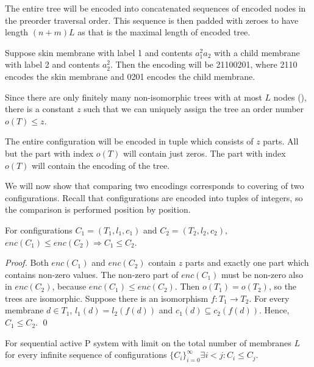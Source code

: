 \documentclass[llncs,submission,copyright,creativecommons]{../lib/lncs/llncs}
\begin{document}
The entire tree will be encoded into concatenated sequences of encoded nodes in the preorder traversal order. This sequence is then padded with zeroes to have length $(n+m)L$ as that is the maximal length of encoded tree.

\begin{example}
  Suppose skin membrane with label 1 and contents $a_1^2a_2$ with a child membrane with label 2 and contents $a_2^2$. Then the encoding will be 21100201, where 2110 encodes the skin membrane and 0201 encodes the child membrane.
\end{example} 

Since there are only finitely many non-isomorphic trees with at most $L$ nodes (\cite{Cayley1881RootedTrees}), there is a constant $z$ such that we can uniquely assign the tree an order number $o(T) \leq z$.

The entire configuration will be encoded in tuple which consists of $z$ parts. All but the part with index $o(T)$ will contain just zeros. The part with index $o(T)$ will contain the encoding of the tree.

We will now show that comparing two encodings corresponds to covering of two configurations. Recall that configurations are encoded into tuples of integers, so the comparison is performed position by position.

\begin{lemma}
\label{encoding_lemma}
  For configurations $C_1 = (T_1, l_1, c_1)$ and $C_2 = (T_2, l_2, c_2)$, $enc(C_1) \leq enc(C_2)\Rightarrow C_1\leq C_2$.
\end{lemma}

\begin{proof}
  Both $enc(C_1)$ and $enc(C_2)$ contain $z$ parts and exactly one part which contains non-zero values. The non-zero part of $enc(C_1)$ must be non-zero also in $enc(C_2)$, because $enc(C_1)\leq enc(C_2)$. Then $o(T_1)=o(T_2)$, so the trees are isomorphic. Suppose there is an isomorphism $f:T_1\rightarrow T_2$. For every membrane $d\in T_1$, $l_1(d)=l_2(f(d))$ and $c_1(d)\subseteq c_2(f(d))$. Hence, $C_1\leq C_2$.
  \qed
\end{proof}

\begin{lemma}
\label{infinite_sequence_of_configurations_lemma}
  For sequential active P system with limit on the total number of membranes $L$ for every infinite sequence of configurations $\{C_i\}_{i=0}^\infty\exists i<j: C_i\leq C_j$.
\end{lemma}
\end{document}
